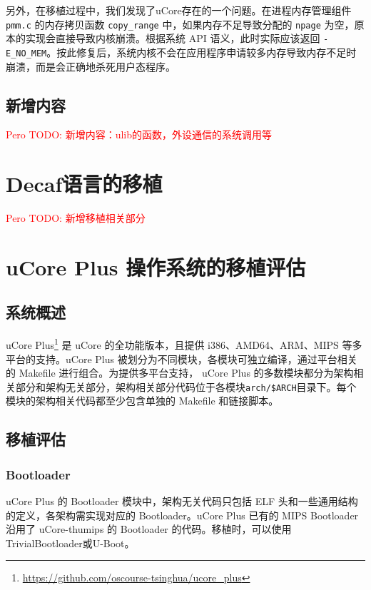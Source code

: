 另外，在移植过程中，我们发现了uCore存在的一个问题。在进程内存管理组件 \texttt{pmm.c} 的内存拷贝函数 \texttt{copy\_range} 中，如果内存不足导致分配的 \texttt{npage} 为空，原本的实现会直接导致内核崩溃。根据系统 API 语义，此时实际应该返回 \texttt{-E\_NO\_MEM}。按此修复后，系统内核不会在应用程序申请较多内存导致内存不足时崩溃，而是会正确地杀死用户态程序。

\subsection{新增内容}

\textcolor{red}{Pero TODO: 新增内容：ulib的函数，外设通信的系统调用等}


\section{Decaf语言的移植}

\textcolor{red}{Pero TODO: 新增移植相关部分}

\section{uCore Plus 操作系统的移植评估}

\subsection{系统概述}
uCore Plus\footnote{\url{https://github.com/oscourse-tsinghua/ucore_plus}} 是 uCore 的全功能版本，且提供 i386、AMD64、ARM、MIPS 等多平台的支持。uCore Plus 被划分为不同模块，各模块可独立编译，通过平台相关的 Makefile 进行组合。为提供多平台支持， uCore Plus 的多数模块都分为架构相关部分和架构无关部分，架构相关部分代码位于各模块\texttt{arch/\$ARCH}目录下。每个模块的架构相关代码都至少包含单独的 Makefile 和链接脚本。

\subsection{移植评估}

\subsubsection{Bootloader}
uCore Plus 的 Bootloader 模块中，架构无关代码只包括 ELF 头和一些通用结构的定义，各架构需实现对应的 Bootloader。uCore Plus 已有的 MIPS Bootloader 沿用了 uCore-thumips 的 Bootloader 的代码。移植时，可以使用TrivialBootloader或U-Boot。

